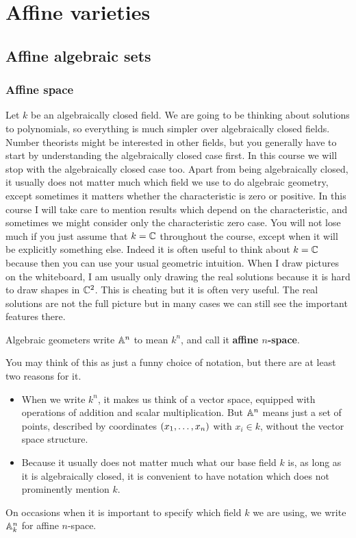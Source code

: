\pagebreak

\section{Affine varieties}

\subsection{Affine algebraic sets}

\subsubsection{Affine space}

Let $ k $ be an algebraically closed field. We are going to be thinking about solutions to polynomials, so everything is much simpler over algebraically closed fields. Number theorists might be interested in other fields, but you generally have to start by understanding the algebraically closed case first. In this course we will stop with the algebraically closed case too. Apart from being algebraically closed, it usually does not matter much which field we use to do algebraic geometry, except sometimes it matters whether the characteristic is zero or positive. In this course I will take care to mention results which depend on the characteristic, and sometimes we might consider only the characteristic zero case. You will not lose much if you just assume that $ k = \CC $ throughout the course, except when it will be explicitly something else. Indeed it is often useful to think about $ k = \CC $ because then you can use your usual geometric intuition. When I draw pictures on the whiteboard, I am usually only drawing the real solutions because it is hard to draw shapes in $ \CC^2 $. This is cheating but it is often very useful. The real solutions are not the full picture but in many cases we can still see the important features there.

\begin{definition*}
Algebraic geometers write $ \AA^n $ to mean $ k^n $, and call it \textbf{affine $ n $-space}.
\end{definition*}

You may think of this as just a funny choice of notation, but there are at least two reasons for it.
\begin{itemize}
\item When we write $ k^n $, it makes us think of a vector space, equipped with operations of addition and scalar multiplication. But $ \AA^n $ means just a set of points, described by coordinates $ \br{x_1, \dots, x_n} $ with $ x_i \in k $, without the vector space structure.
\item Because it usually does not matter much what our base field $ k $ is, as long as it is algebraically closed, it is convenient to have notation which does not prominently mention $ k $.
\end{itemize}
On occasions when it is important to specify which field $ k $ we are using, we write $ \AA_k^n $ for affine $ n $-space.

